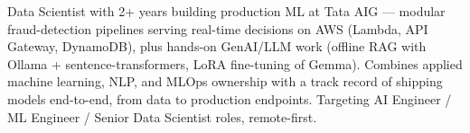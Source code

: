 \small{Data Scientist with 2+ years building production ML at Tata AIG --- modular fraud-detection pipelines serving real-time decisions on AWS (Lambda, API Gateway, DynamoDB), plus hands-on GenAI/LLM work (offline RAG with Ollama + sentence-transformers, LoRA fine-tuning of Gemma). Combines applied machine learning, NLP, and MLOps ownership with a track record of shipping models end-to-end, from data to production endpoints. Targeting AI Engineer / ML Engineer / Senior Data Scientist roles, remote-first.}
